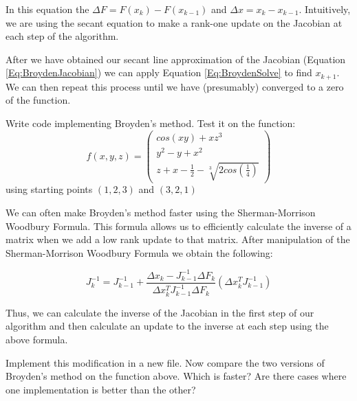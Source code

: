 In this equation the $\Delta F = F(x_k)-F(x_{k-1})$ and $\Delta x = x_k-x_{k-1}$. Intuitively, we are using the secant equation to make a rank-one update on the Jacobian at each step of the algorithm.

After we have obtained our secant line approximation of the Jacobian (Equation \ref{Eq:BroydenJacobian}) we can apply Equation \ref{Eq:BroydenSolve} to find $x_{k+1}$. We can then repeat this process until we have (presumably) converged to a zero of the function. 
% 
% 
% 

\begin{problem}
Write code implementing Broyden's method. Test it on the function:
\[
f(x,y,z) = 
 \left( \begin{array}{ccc}
cos(xy)+ xz^3 \\
y^2 - y + x^2 \\
z + x-\frac{1}{2}-\sqrt[3]{2cos(\frac{1}{4})} \end{array} \right)
\]
using starting points $(1,2,3)$ and $(3,2,1)$
\end{problem}

We can often make Broyden's method faster using the Sherman-Morrison Woodbury Formula. This formula allows us to efficiently calculate the inverse of a matrix when we add a low rank update to that matrix. After manipulation of the Sherman-Morrison Woodbury Formula we obtain the following:

\[
J_k^{-1} = J_{k-1}^{-1} + \frac{\Delta x_k - J_{k-1}^{-1}\Delta F_k}{\Delta x_k^T J_{k-1}^{-1}\Delta F_k} (\Delta x_k^T J_{k-1}^{-1})
\]

Thus, we can calculate the inverse of the Jacobian in the first step of our algorithm and then calculate an update to the inverse at each step using the above formula.

\begin{problem}
Implement this modification in a new file. Now compare the two versions of Broyden's method on the function above. Which is faster? Are there cases where one implementation is better than the other?
\end{problem}
